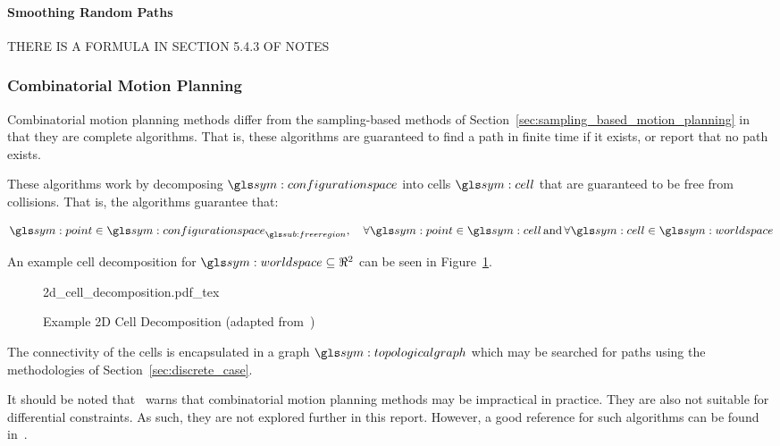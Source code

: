 			\paragraph{Smoothing Random Paths}%
			\label{sec:smoothing_random_paths}

				THERE IS A FORMULA IN SECTION 5.4.3 OF NOTES

		\subsubsection{Combinatorial Motion Planning}%
		\label{sec:combinatorial_motion_planning}

			Combinatorial motion planning methods differ from the sampling-based
			methods of Section~\ref{sec:sampling_based_motion_planning} in that
			they are complete algorithms. That is, these algorithms are
			guaranteed to find a path in finite time if it exists, or report
			that no path exists.

			These algorithms work by decomposing $\configurationspace$ into
			cells $\cell$ that are guaranteed to be free from collisions. That
			is, the algorithms guarantee that:

			\begin{equation}
				\point\in\configurationspace_{\freeregion},
				\quad
				\forall\point\in\cell \, \text{and} \, \forall\cell\in\world
			\end{equation}

			An example cell decomposition for $\world\subseteq\Re^2$ can be seen
			in Figure~\ref{fig:example_2d_cell_decomposition}.

			\begin{figure}[hb]
				\centering
				\def\svgwidth{\columnwidth}
				{2d_cell_decomposition.pdf_tex}
				\caption[Example 2D Cell Decomposition]
				{%
					Example 2D Cell Decomposition 
					(adapted from~\cite[][page 269]
						{bib:planning:planning_algorithms})
				}%
				\label{fig:example_2d_cell_decomposition}
			\end{figure}

			The connectivity of the cells is encapsulated in a graph
			$\topologicalgraph$ which may be searched for paths using the
			methodologies of Section~\ref{sec:discrete_case}.

			It should be noted that~\cite{bib:planning:planning_algorithms}
			warns that combinatorial motion planning methods may be impractical
			in practice. They are also not suitable for differential
			constraints.  As such, they are not explored further in this report.
			However, a good reference for such algorithms can be found
			in~\cite{bib:planning:robot_motion_planning}.

